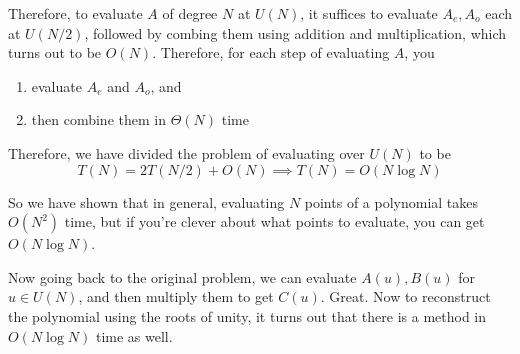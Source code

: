   Therefore, to evaluate $A$ of degree $N$ at $U(N)$, it suffices to evaluate $A_e, A_o$ each at $U(N/2)$, followed by combing them using addition and multiplication, which turns out to be $O(N)$. Therefore, for each step of evaluating $A$, you 
  \begin{enumerate}
    \item evaluate $A_e$ and $A_o$, and 
    \item then combine them in $\Theta(N)$ time
  \end{enumerate}

  \begin{algo}
    
    \begin{algorithm}[H]
      \label{alg:unity}
      \begin{algorithmic}
        \Require{}
        \State 
        \EndFunction
      \end{algorithmic}
    \end{algorithm}
  \end{algo}

  Therefore, we have divided the problem of evaluating over $U(N)$ to be 
  \begin{equation}
    T(N) = 2 T(N/2) + O(N) \implies T(N) = O( N \log{N}) 
  \end{equation}

  So we have shown that in general, evaluating $N$ points of a polynomial takes $O(N^2)$ time, but if you're clever about what points to evaluate, you can get $O(N \log N)$. 

  Now going back to the original problem, we can evaluate $A(u), B(u)$ for $u \in U(N)$, and then multiply them to get $C(u)$. Great. Now to reconstruct the polynomial using the roots of unity, it turns out that there is a method in $O(N \log{N})$ time as well. 

